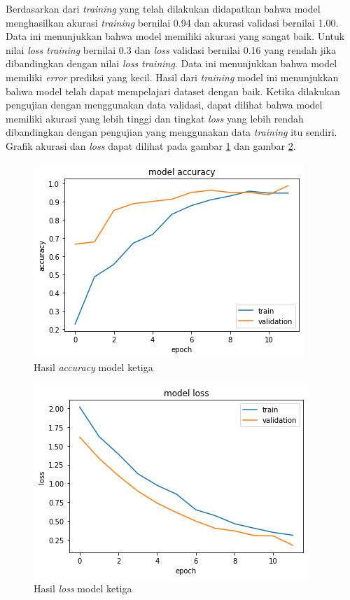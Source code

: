 Berdasarkan dari \emph{training} yang telah dilakukan didapatkan bahwa model menghasilkan akurasi \emph{training} bernilai 0.94 dan akurasi validasi bernilai 1.00. Data ini menunjukkan bahwa model memiliki akurasi yang sangat baik. Untuk nilai \emph{loss training} bernilai 0.3 dan \emph{loss} validasi bernilai 0.16 yang rendah jika dibandingkan dengan nilai \emph{loss training}. Data ini menunjukkan bahwa model memiliki \emph{error} prediksi yang kecil. Hasil dari \emph{training} model ini menunjukkan bahwa model telah dapat mempelajari dataset dengan baik. Ketika dilakukan pengujian dengan menggunakan data validasi, dapat dilihat bahwa model memiliki akurasi yang lebih tinggi dan tingkat \emph{loss} yang lebih rendah dibandingkan dengan pengujian yang menggunakan data \emph{training} itu sendiri. Grafik akurasi dan \emph{loss} dapat dilihat pada gambar \ref{fig:model3-train-acc} dan gambar \ref{fig:model3-train-loss}.

\begin{figure}[H]
  \centering

  \includegraphics[scale=0.75]{gambar/bab4-uji-model-best-acc.png}

  \caption{Hasil \emph{accuracy} model ketiga}
  \label{fig:model3-train-acc}
\end{figure}

\begin{figure}[H]
  \centering

  \includegraphics[scale=0.75]{gambar/bab4-uji-model-best-loss.png}

  \caption{Hasil \emph{loss} model ketiga}
  \label{fig:model3-train-loss}
\end{figure}


